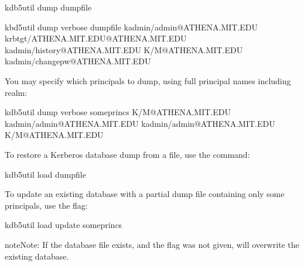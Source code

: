 \documentclass[letterpaper,10pt,english]{sphinxmanual}
\begin{document}
%
\begin{sphinxVerbatim}[commandchars=\\\{\}]
\PYGZdl{} kdb5\PYGZus{}util dump dumpfile

\PYGZdl{} kbd5\PYGZus{}util dump \PYGZhy{}verbose dumpfile
kadmin/admin@ATHENA.MIT.EDU
krbtgt/ATHENA.MIT.EDU@ATHENA.MIT.EDU
kadmin/history@ATHENA.MIT.EDU
K/M@ATHENA.MIT.EDU
kadmin/changepw@ATHENA.MIT.EDU
\end{sphinxVerbatim}

You may specify which principals to dump, using full principal names
including realm:

%
\begin{sphinxVerbatim}[commandchars=\\\{\}]
\PYGZdl{} kdb5\PYGZus{}util dump \PYGZhy{}verbose someprincs K/M@ATHENA.MIT.EDU kadmin/admin@ATHENA.MIT.EDU
kadmin/admin@ATHENA.MIT.EDU
K/M@ATHENA.MIT.EDU
\end{sphinxVerbatim}

To restore a Kerberos database dump from a file, use the
{\hyperref[\detokenize{admin/admin_commands/kdb5_util:kdb5-util-8}]{}}  command:

%
\begin{sphinxVerbatim}[commandchars=\\\{\}]
\PYGZdl{} kdb5\PYGZus{}util load dumpfile
\end{sphinxVerbatim}

To update an existing database with a partial dump file containing
only some principals, use the  flag:

%
\begin{sphinxVerbatim}[commandchars=\\\{\}]
\PYGZdl{} kdb5\PYGZus{}util load \PYGZhy{}update someprincs
\end{sphinxVerbatim}

\begin{sphinxadmonition}{note}{Note:}
If the database file exists, and the  flag was not
given,  will overwrite the existing database.
\end{sphinxadmonition}
\end{document}
